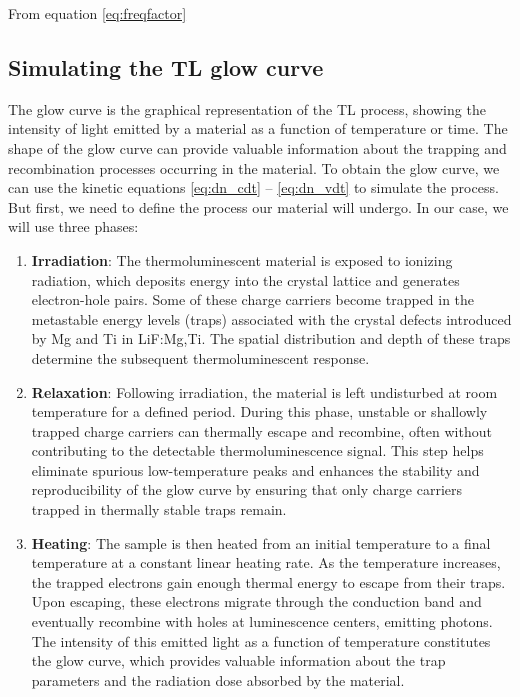From equation \ref{eq:freqfactor}


\subsection{Simulating the TL glow curve} \label{sec:simulacioncurva}

The glow curve is the graphical representation of the TL process, showing the intensity of light emitted by a material as a function of temperature or time. The shape of the glow curve can provide valuable information about the trapping and recombination processes occurring in the material. To obtain the glow curve, we can use the kinetic equations \ref{eq:dn_cdt} -- \ref{eq:dn_vdt} to simulate the process. But first, we need to define the process our material will undergo. In our case, we will use three phases:

\begin{enumerate}
    \item \textbf{Irradiation}: The thermoluminescent material is exposed to ionizing radiation, which deposits energy into the crystal lattice and generates electron-hole pairs. Some of these charge carriers become trapped in the metastable energy levels (traps) associated with the crystal defects introduced by Mg and Ti in LiF:Mg,Ti. The spatial distribution and depth of these traps determine the subsequent thermoluminescent response.

    \item \textbf{Relaxation}: Following irradiation, the material is left undisturbed at room temperature for a defined period. During this phase, unstable or shallowly trapped charge carriers can thermally escape and recombine, often without contributing to the detectable thermoluminescence signal. This step helps eliminate spurious low-temperature peaks and enhances the stability and reproducibility of the glow curve by ensuring that only charge carriers trapped in thermally stable traps remain.

    \item \textbf{Heating}: The sample is then heated from an initial temperature to a final temperature at a constant linear heating rate. As the temperature increases, the trapped electrons gain enough thermal energy to escape from their traps. Upon escaping, these electrons migrate through the conduction band and eventually recombine with holes at luminescence centers, emitting photons. The intensity of this emitted light as a function of temperature constitutes the glow curve, which provides valuable information about the trap parameters and the radiation dose absorbed by the material.
\end{enumerate}

